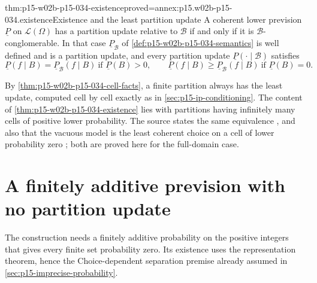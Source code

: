 \begin{hbtheorem}{thm:p15-w02b-p15-034-existence}{proved=annex:p15.w02b-p15-034.existence}{Existence and the least partition update}
A coherent lower prevision \(\underline P\) on \(\mathcal L(\Omega)\) has
a partition update relative to \(\mathcal B\) if and only if it is
\(\mathcal B\)-conglomerable. In that case \(\underline P_{\mathcal B}\)
of \cref{def:p15-w02b-p15-034-semantics} is well defined and is a partition
update, and every partition update
\(\underline P(\cdot\mid\mathcal B)\) satisfies
\[
 \underline P(f\mid B)=\underline P_{\mathcal B}(f\mid B)\ \text{if }\underline P(B)>0,\qquad
 \underline P(f\mid B)\geq\underline P_{\mathcal B}(f\mid B)\ \text{if }\underline P(B)=0 .
\]
\end{hbtheorem}

By \cref{thm:p15-w02b-p15-034-cell-facts}, a finite partition always has
the least update, computed cell by cell exactly as in
\cref{sec:p15-ip-conditioning}. The content of
\cref{thm:p15-w02b-p15-034-existence} lies with partitions having
infinitely many cells of positive lower probability. The source states the
same equivalence \cite[p.~23]{MirandaCoherentLowerPrevisionsCapture}, and
also that the vacuous model is the least coherent choice on a cell of
lower probability zero \cite[p.~24]{MirandaCoherentLowerPrevisionsCapture};
both are proved here for the full-domain case.

\section{A finitely additive prevision with no partition update}
\label{sec:p15-w02b-p15-034-counterexample}

The construction needs a finitely additive probability on the positive
integers that gives every finite set probability zero. Its existence uses
the representation theorem, hence the Choice-dependent separation premise
already assumed in \cref{sec:p15-imprecise-probability}.

